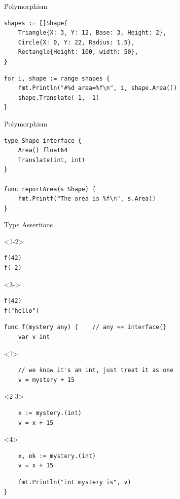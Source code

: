 \documentclass[pdf]{beamer}
\begin{document}
\begin{frame}[fragile]{Polymorphism}
\begin{lstlisting}
shapes := []Shape{
    Triangle{X: 3, Y: 12, Base: 3, Height: 2},
    Circle{X: 0, Y: 22, Radius: 1.5},
    Rectangle{Height: 100, width: 50},
}
\end{lstlisting}
\pause
\begin{lstlisting}
for i, shape := range shapes {
    fmt.Println("#%d area=%f\n", i, shape.Area())
    shape.Translate(-1, -1)
}
\end{lstlisting}
\end{frame}

\begin{frame}[fragile]{Polymorphism}
\begin{lstlisting}
type Shape interface {
    Area() float64
    Translate(int, int)
}

func reportArea(s Shape) {
    fmt.Printf("The area is %f\n", s.Area()
}
\end{lstlisting}
\end{frame}

\begin{frame}[fragile]{Type Assertions}
\begin{onlyenv}<1-2>
\begin{lstlisting}
f(42)
f(-2)
\end{lstlisting}
\end{onlyenv}
\begin{onlyenv}<3->
\begin{lstlisting}
f(42)
f("hello")
\end{lstlisting}
\end{onlyenv}
\begin{lstlisting}
func f(mystery any) {    // any == interface{}
    var v int
\end{lstlisting}
\begin{onlyenv}<1>
\begin{lstlisting}
    // we know it's an int, just treat it as one
    v = mystery + 15
\end{lstlisting}
\end{onlyenv}
\begin{onlyenv}<2-3>
\begin{lstlisting}
    x := mystery.(int)
    v = x + 15
\end{lstlisting}
\end{onlyenv}
\begin{onlyenv}<4>
\begin{lstlisting}
    x, ok := mystery.(int)
    v = x + 15
\end{lstlisting}
\end{onlyenv}
\begin{lstlisting}
    fmt.Println("int mystery is", v)
}
\end{lstlisting}
\end{frame}
\end{document}
